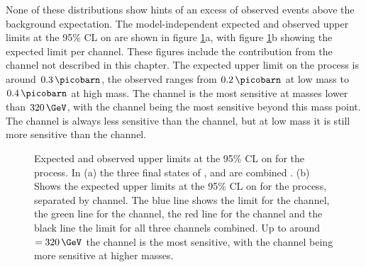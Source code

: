 None of these distributions show hints of an excess of observed events above the background expectation. 
The model-independent expected and observed upper limits at the 95\% \ac{CL}
on \xsbr are shown in 
figure \ref{fig:hhh_results_modelindep}a, with figure \ref{fig:hhh_results_modelindep}b 
showing the expected limit per channel. These figures include the contribution from the 
\tautau channel not described in this chapter. The expected upper limit
on the \Htohhtobbtautau process is around $0.3\,\picobarn$, the observed ranges
from $0.2\,\picobarn$ at low mass to $0.4\,\picobarn$ at high mass. 
The \mutau channel is the most sensitive at masses lower than $320\,\GeV$, with 
the \tautau channel being the most sensitive beyond this mass point. The \etau channel is always
less sensitive than the \mutau channel, but at low mass it is still more sensitive than the \tautau 
channel.

\begin{figure}[h!]
\begin{center}
\caption[Expected and observed upper limits at the 95\% CL on 
\xsbr for the \Htohhtobbtautau process.]{Expected and observed upper limits at the 95\% \ac{CL} on \xsbr  
for the \Htohhtobbtautau process. In (a) the three final states of \etau, \mutau and \tautau are combined \cite{CMS-HIG-14-034}.
(b) Shows the expected upper limits at the 95\% \ac{CL} on \xsbr for the \Htohhtobbtautau
process, separated by channel. The blue line shows the limit for the \tautau channel, the green line for the \mutau channel, the red line
for the \etau channel and the black line the limit for all three channels combined. Up to around \mH~$= 320\,\GeV$ the \mutau channel is the most
sensitive, with the \tautau channel being more sensitive at higher masses.}
\label{fig:hhh_results_modelindep}
\end{center}
\end{figure}

